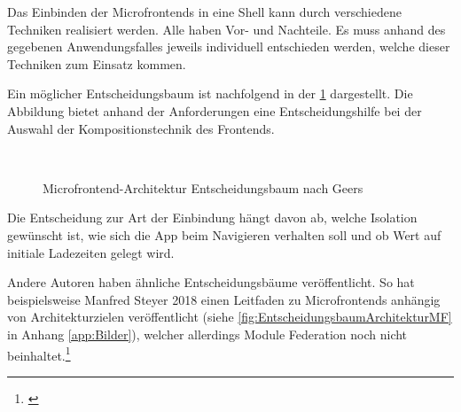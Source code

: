 Das Einbinden der Microfrontends in eine Shell kann durch verschiedene Techniken realisiert werden. Alle haben Vor- und Nachteile. Es muss anhand des gegebenen Anwendungsfalles jeweils individuell entschieden werden, welche dieser Techniken zum Einsatz kommen.

Ein möglicher Entscheidungsbaum ist nachfolgend in der \cref{fig:EntscheidungsbaumArchitektur} dargestellt. Die Abbildung bietet anhand der Anforderungen eine Entscheidungshilfe bei der Auswahl der Kompositionstechnik des Frontends.

\newpage
\begin{figure}[hbt!]
	\centering
	\begin{minipage}[t]{0.8\textwidth}	
		\caption{Microfrontend-Architektur Entscheidungsbaum nach Geers}
		\\ %
		\label{fig:EntscheidungsbaumArchitektur}
	\end{minipage}
\end{figure}

Die Entscheidung zur Art der Einbindung hängt davon ab, welche Isolation gewünscht ist, wie sich die App beim Navigieren verhalten soll und ob Wert auf initiale Ladezeiten gelegt wird.

Andere Autoren haben ähnliche Entscheidungsbäume veröffentlicht. So hat beispielsweise Manfred Steyer 2018 einen Leitfaden zu Microfrontends anhängig von Architekturzielen veröffentlicht (siehe \cref{fig:EntscheidungsbaumArchitekturMF} in Anhang \ref{app:Bilder}), welcher allerdings Module Federation noch nicht beinhaltet.\footnote{\cite[vgl.][]{Steyer2018}}